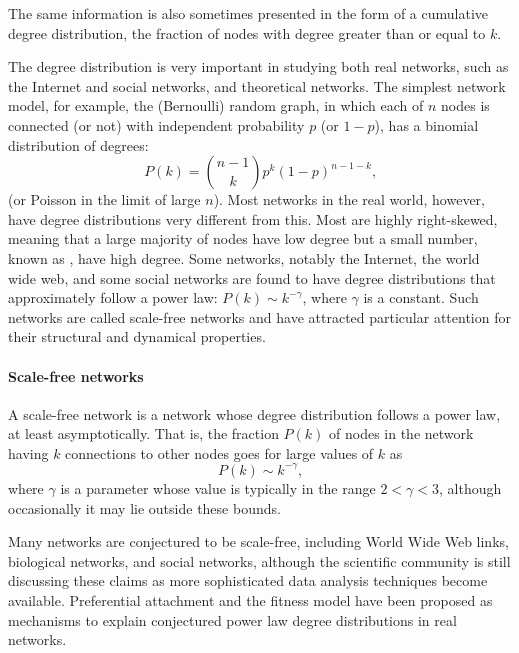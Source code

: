       The same information is also sometimes presented in the form of a cumulative degree distribution, the fraction of nodes with degree greater than or equal to $k$.
      
      The degree distribution is very important in studying both real networks, such as the Internet and social networks, and theoretical networks. The simplest network model, for example, the (Bernoulli) random graph, in which each of $n$ nodes is connected (or not) with independent probability $p$ (or $1 − p$), has a binomial distribution of degrees:
      \begin{equation}
        P(k) = \binom{n-1}{k} p^k (1 - p)^{n-1-k}\mbox{,}
      \end{equation}
      (or Poisson in the limit of large $n$). Most networks in the real world, however, have degree distributions very different from this. Most are highly right-skewed, meaning that a large majority of nodes have low degree but a small number, known as , have high degree. Some networks, notably the Internet, the world wide web, and some social networks are found to have degree distributions that approximately follow a power law: $P(k) \sim k^{−\gamma}$, where $\gamma$ is a constant. Such networks are called scale-free networks and have attracted particular attention for their structural and dynamical properties.
      
      \paragraph{Scale-free networks}
  
        A scale-free network is a network whose degree distribution follows a power law, at least asymptotically. That is, the fraction $P(k)$ of nodes in the network having $k$ connections to other nodes goes for large values of $k$ as
    \begin{equation}
      P(k) \sim k^{-\gamma} \mbox{,}
    \end{equation}
    where $\gamma$ is a parameter whose value is typically in the range $2 < \gamma < 3$, although occasionally it may lie outside these bounds.\cite{OnnelaSaramakiBarabasi2007,ChoromanskiMatuszakMiekisz2013}

        Many networks are conjectured to be scale-free, including World Wide Web links, biological networks, and social networks, although the scientific community is still discussing these claims as more sophisticated data analysis techniques become available.\cite{ClausetShaliziNewman2007} Preferential attachment and the fitness model have been proposed as mechanisms to explain conjectured power law degree distributions in real networks.
        
